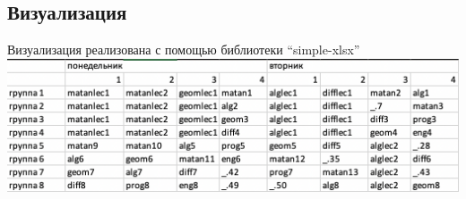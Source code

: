 
\subsection{Визуализация}
Визуализация реализована с помощью библиотеки ``simple-xlsx''~\cite{symple}
\includegraphics[width=1\textwidth]{sched.png}

